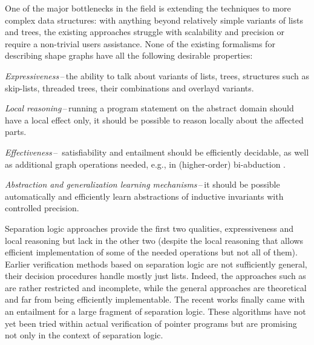 {One of the major bottlenecks in the field is extending the techniques to more complex data structures: with anything beyond relatively simple variants of lists and trees,
%
the existing approaches
struggle with scalability and precision or require a non-trivial users assistance.
%
None of the existing formalisms for describing shape graphs have all the following desirable properties:
\begin{enumerate*}
\item
\emph{Expressiveness}\,--\,the ability to talk about variants of lists, trees, structures such as skip-lists, threaded trees, their combinations and overlayd variants.
\item
\emph{Local reasoning}\,--\,running a program statement on the abstract domain should have a local effect only, it should be possible to reason locally about the affected parts.
\item
\emph{Effectiveness}\,--\,
 satisfiability and entailment should be efficiently decidable, as well as additional graph operations needed, e.g., in (higher-order) bi-abduction \cite{abduction11,locle:secondorder}.
\item
\emph{Abstraction and generalization learning mechanisms}\,--\,it should be possible automatically and efficiently learn abstractions of inductive invariants with controlled precision.
\end{enumerate*}
%

Separation logic approaches provide the first two qualities,
expressiveness and local reasoning
but lack in the other two (despite the local reasoning that allows efficient implementation of some of the needed operations but not all of them).
%
Earlier verification methods based on separation logic are not sufficiently general, their decision procedures handle mostly just lists. Indeed, the approaches
such as \cite{iosif_deciding_2014,enea_compositional_2014,ruzica_automating} are rather restricted and incomplete, while the general approaches \cite{iosif_treewidth_2013,matheja_treelike_2015} are theoretical and far from being efficiently implementable.
%
The recent works \cite{Katelaan:seplog,pagel,Iosif:CSL,Iosif:LPAR} finally came with an entailment for a large fragment of separation logic. These algorithms have not yet been tried within actual verification of pointer programs but are promising not only in the context of separation logic.

}
